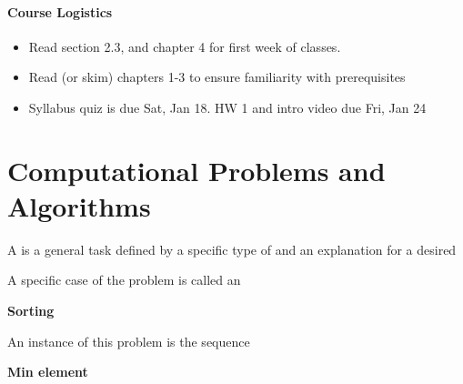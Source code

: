 \documentclass[11  pt]{article}
\begin{document}
\onehalfspacing


\paragraph{Course Logistics}

\begin{itemize}
\item Read section 2.3, and chapter 4 for first week of classes.
\item Read (or skim) chapters 1-3 to ensure familiarity with prerequisites
\item Syllabus quiz is due Sat, Jan 18. HW 1 and intro video due Fri, Jan 24
\end{itemize}

\section{Computational Problems and Algorithms}

\begin{definition} \noindent A  is a general task defined by a specific type of  and an explanation for a desired  
\end{definition}

\vs{.5cm}

\noindent A specific case of the problem is called an 

\begin{example}\textbf{Sorting} \\


An instance of this problem is the sequence %
\end{example}
\begin{example}\textbf{Min element} \\
	
	\vs{5pt}
\end{example}
\end{document}
